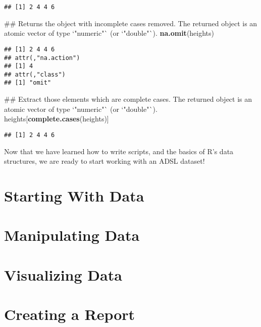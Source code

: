 \documentclass[]{book}
\newenvironment{Shaded}{\begin{snugshade}}{\end{snugshade}}
\newcommand{\KeywordTok}[1]{\textcolor[rgb]{0.13,0.29,0.53}{\textbf{#1}}}
\newcommand{\NormalTok}[1]{#1}
\begin{document}
\begin{verbatim}
## [1] 2 4 4 6
\end{verbatim}

\begin{Shaded}
\begin{Highlighting}[]
\NormalTok{## Returns the object with incomplete cases removed. The returned object is an atomic vector of type `"numeric"` (or `"double"`).}
\KeywordTok{na.omit}\NormalTok{(heights)}
\end{Highlighting}
\end{Shaded}

\begin{verbatim}
## [1] 2 4 4 6
## attr(,"na.action")
## [1] 4
## attr(,"class")
## [1] "omit"
\end{verbatim}

\begin{Shaded}
\begin{Highlighting}[]
\NormalTok{## Extract those elements which are complete cases. The returned object is an atomic vector of type `"numeric"` (or `"double"`).}
\NormalTok{heights[}\KeywordTok{complete.cases}\NormalTok{(heights)]}
\end{Highlighting}
\end{Shaded}

\begin{verbatim}
## [1] 2 4 4 6
\end{verbatim}

Now that we have learned how to write scripts, and the basics of R's
data structures, we are ready to start working with an ADSL dataset!

\chapter{Starting With Data}\label{starting-with-data}

\chapter{Manipulating Data}\label{manipulating-data}

\chapter{Visualizing Data}\label{visualizing-data}

\chapter{Creating a Report}\label{creating-a-report}


\end{document}
